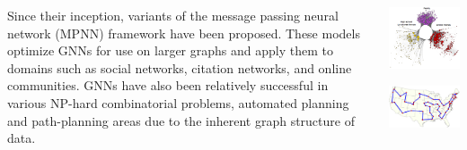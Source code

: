 \documentclass[20pt,,margin=1in,innermargin=-4.5in,blockverticalspace=-0.25in]{tikzposter}
\begin{document}
\begin{columns}
{		\par Since their inception, variants of the message passing neural network (MPNN) framework have been proposed. These models optimize
		GNNs for use on larger graphs and apply them to domains such as social networks, citation networks, and online communities. GNNs have
		also been relatively successful in various NP-hard combinatorial problems, automated planning and path-planning areas due to the
		inherent graph structure of data.
		\begin{center}
			\begin{minipage}{0.45\linewidth}
				\centering
				\begin{tikzfigure}
					\includegraphics[width=13.6cm]{Figures/GNN_APP.png}
				\end{tikzfigure}%
			\end{minipage}\hfill
			\begin{minipage}{0.55\linewidth}
				\centering
				\begin{tikzfigure}
					\includegraphics[width=14cm]{Figures/TSP.png}

\end{tikzfigure}
\end{minipage}
\end{center}}
\end{columns}
\end{document}
